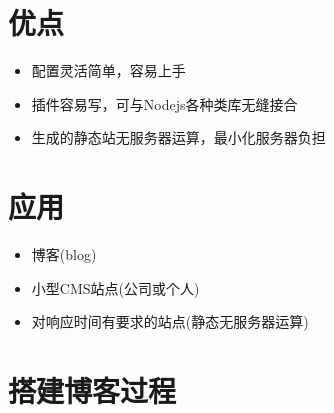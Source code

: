 \documentclass[11pt]{article}
\begin{document}
\section{优点}
\label{sec:orgheadline4}

\begin{itemize}
\item 配置灵活简单，容易上手
\item 插件容易写，可与Nodejs各种类库无缝接合
\item 生成的静态站无服务器运算，最小化服务器负担
\end{itemize}

\section{应用}
\label{sec:orgheadline5}

\begin{itemize}
\item 博客(blog)
\item 小型CMS站点(公司或个人)
\item 对响应时间有要求的站点(静态无服务器运算)
\end{itemize}

\section{搭建博客过程}
\label{sec:orgheadline6}
\end{document}

